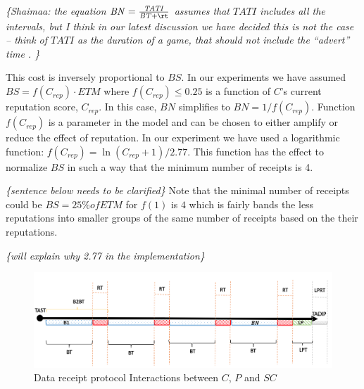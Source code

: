 \documentclass[letterpaper, 10 pt, conference]{ieeeconf}  %
\newcommand{\mynote}[1]{{\leavevmode\smaller\itshape\color{red}\{#1\}}}
\newcommand{\anote}[1]{{\leavevmode\smaller\itshape\color{red}\{#1\}}}
\newcommand{\bs}{\ensuremath{\mathit{BS}}}
\newcommand{\mr}{\ensuremath{\mathit{MR}}}
\newcommand{\tati}{\ensuremath{\mathit{TATI}}}
\newcommand{\etm}{\ensuremath{\mathit{ETM}}}
\newcommand{\bn}{\ensuremath{\mathit{BN}}}
\newcommand{\smartc}{\ensuremath{\mathit{SC}}}
\newcommand{\bt}{\ensuremath{\mathit{BT}}}
\newcommand{\crep}{\ensuremath{C_{\mathit{rep}} }}
\begin{document}
\mynote{Shaimaa:  the equation $\bn=\frac{\tati}{\bt+\rt}$ assumes that \tati{} includes all the \rt{} intervals, but I think in our latest discussion we have decided this is not the case -- think of \tati{} as the duration of a game, that should not include the ``advert'' time \rt{}.
}



This cost is inversely proportional to \bs{}. In our experiments we have assumed $\bs= f(\crep) \cdot \etm$ where   $f(\crep{}) \leq 0.25$ is a function of $C$'s current reputation score, \crep.
In this case, \bn{} simplifies to $\bn =  1/f(\crep{})$.
Function  $f(\crep{})$ is a parameter in the model and can be chosen to either amplify or reduce the effect of reputation. In our experiment we have used a logarithmic function:  $f(\crep{}) = \ln(\crep + 1)/2.77 $. This function has the effect to normalize \bs{} in such a way that 
the minimum number of receipts is 4.

\mynote{sentence below needs to be  clarified}
Note that the minimal number of receipts could be $\bs = 25\% of ETM $ for $f(1)$ is $4$ which is fairly bands the less reputations into smaller groups of the same number of receipts based on the their reputations.

\mynote{will explain why 2.77 in the implementation}


\begin{figure}
	\caption{Data receipt protocol Interactions between $C$, $P$ and \smartc{}}
	\label{fig:batching}
	\includegraphics[width=.7\textwidth]{Dis}
	\centering
\end{figure}

\end{document}
